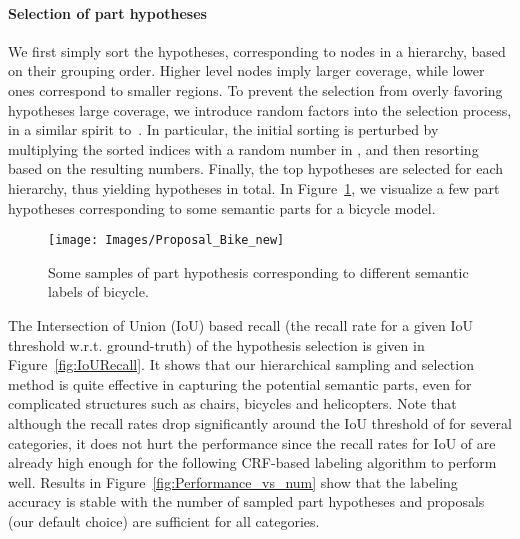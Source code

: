 \documentclass[acmtog]{acmart}
\newcommand{\kx}[1]{{\color{black}#1}}
\newcommand{\new}[1]{{\color{black}#1}}
\begin{document}
\paragraph{\textbf{Selection of part hypotheses}}
We first simply sort the hypotheses, corresponding to nodes in a hierarchy,
based on their grouping order.
Higher level nodes imply larger coverage, while lower ones correspond to smaller regions.
To prevent the selection from overly favoring hypotheses large coverage,
we introduce random factors into the selection process, in a
similar spirit to~\cite{Carreira_PAMI12,Manen2014Prime,Van2011Segmentation}.
In particular, the initial sorting is perturbed by multiplying the sorted indices with a random number in ,
and then resorting based on the resulting numbers. Finally, the top  hypotheses are selected for each hierarchy,
thus yielding  hypotheses in total.
In Figure~\ref{fig:Proposal_Bike},
we visualize a few part hypotheses corresponding to some semantic parts for a bicycle model.

\begin{figure}[!t]
  \centering
  \texttt{[image: Images/Proposal\_Bike\_new]}
  \caption{\new{Some samples of part hypothesis corresponding to different semantic labels of bicycle.}}
  \label{fig:Proposal_Bike}
\end{figure}





\kx{
The Intersection of Union (IoU) based recall (the recall rate for a given IoU threshold w.r.t. ground-truth) of the hypothesis selection is given in Figure~\ref{fig:IoURecall}.
It shows that our hierarchical sampling and selection method is quite effective in
capturing the potential semantic parts, even for complicated structures such as chairs, bicycles
and helicopters.
Note that although the recall rates drop significantly around the IoU threshold of  for several categories, it does not hurt the performance since the recall rates for IoU of  are already high enough for the following CRF-based labeling algorithm to perform well. Results in Figure~\ref{fig:Performance_vs_num} show that the labeling accuracy is stable with the number of sampled part hypotheses and  proposals (our default choice) are sufficient for all categories.
}
\end{document}
